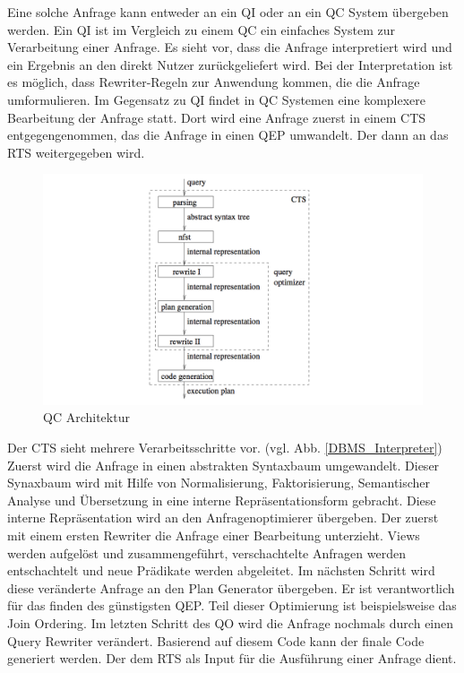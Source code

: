 Eine solche Anfrage kann entweder an ein \ac{QI} oder an ein \ac{QC} System übergeben werden. Ein \ac{QI} ist im Vergleich zu einem \ac{QC} ein einfaches System zur Verarbeitung einer Anfrage. Es sieht vor, dass die Anfrage interpretiert wird und ein Ergebnis an den direkt Nutzer zurückgeliefert wird. Bei der Interpretation ist es möglich, dass Rewriter-Regeln zur Anwendung kommen, die die Anfrage umformulieren. Im Gegensatz zu \ac{QI} findet in \ac{QC} Systemen eine komplexere Bearbeitung der Anfrage statt. Dort wird eine Anfrage zuerst in einem \ac{CTS} entgegengenommen, das die Anfrage in einen \ac{QEP} umwandelt. Der dann an das \ac{RTS} weitergegeben wird.



\begin{figure}[h]
  \centering
  \includegraphics[width=\textwidth]{02_Grundlagen/QC_Architecture.png}
  \caption{\ac{QC} Architektur}
  \label{QC_Architecture}
\end{figure}


Der \ac{CTS} sieht mehrere Verarbeitsschritte vor. (vgl. Abb. \ref{DBMS_Interpreter}) Zuerst wird die Anfrage in einen abstrakten Syntaxbaum umgewandelt. Dieser Synaxbaum wird mit Hilfe von Normalisierung, Faktorisierung, Semantischer Analyse und Übersetzung in eine interne Repräsentationsform gebracht. Diese interne Repräsentation wird an den Anfragenoptimierer übergeben. Der zuerst mit einem ersten Rewriter die Anfrage einer Bearbeitung unterzieht. Views werden aufgelöst und zusammengeführt, verschachtelte Anfragen werden entschachtelt und neue Prädikate werden abgeleitet. Im nächsten Schritt wird diese veränderte Anfrage an den Plan Generator übergeben. Er ist verantwortlich für das finden des günstigsten \ac{QEP}. Teil dieser Optimierung ist beispielsweise das Join Ordering. Im letzten Schritt des \ac{QO} wird die Anfrage nochmals durch einen Query Rewriter verändert. Basierend auf diesem Code kann der finale Code generiert werden. Der dem \ac{RTS} als Input für die Ausführung einer Anfrage dient.


